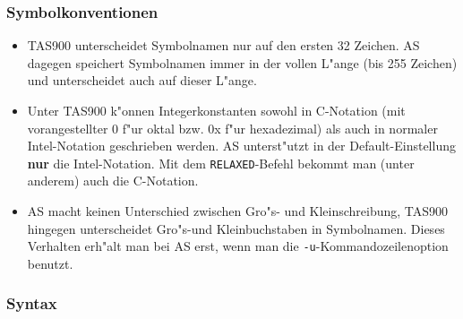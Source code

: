 \documentclass[12pt,a4paper,twoside]{report}
\newcommand{\bb}[1]{{\bf #1}}
\newcommand{\tty}[1]{{\tt #1}}
\begin{document}
\subsubsection{Symbolkonventionen}

\begin{itemize}
\item{TAS900 unterscheidet Symbolnamen nur auf den ersten 32 Zeichen.
      AS dagegen speichert Symbolnamen immer in der vollen L"ange (bis
      255 Zeichen) und unterscheidet auch auf dieser L"ange.}
\item{Unter TAS900 k"onnen Integerkonstanten sowohl in C-Notation (mit
      vorangestellter 0 f"ur oktal bzw. 0x f"ur hexadezimal) als auch in
      normaler Intel-Notation geschrieben werden.  AS unterst"utzt in der
      Default-Einstellung \bb{nur} die Intel-Notation.  Mit dem
      \tty{RELAXED}-Befehl bekommt man (unter anderem) auch die C-Notation.}
\item{AS macht keinen Unterschied zwischen Gro"s- und Kleinschreibung,
      TAS900 hingegen unterscheidet Gro"s-und Kleinbuchstaben in
      Symbolnamen.  Dieses Verhalten erh"alt man bei AS erst, wenn man
      die \tty{-u}-Kommandozeilenoption benutzt.}
\end{itemize}

\subsubsection{Syntax}
\end{document}
